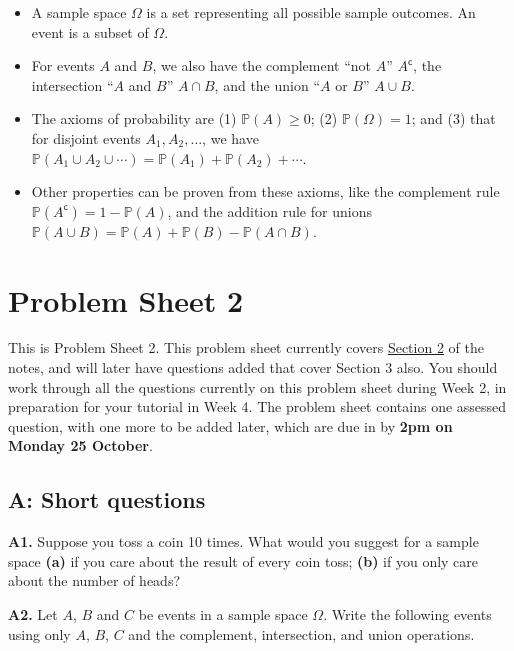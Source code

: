 \documentclass[
  a4paper,
]{book}
\providecommand{\tightlist}{%
  \setlength{\itemsep}{0pt}\setlength{\parskip}{0pt}}
\newif\ifcomm\commtrue
\theoremstyle{definition}
\theoremstyle{definition}
\theoremstyle{definition}
\theoremstyle{definition}
\theoremstyle{remark}
\begin{document}
\begin{itemize}
\tightlist
\item
  A sample space \(\Omega\) is a set representing all possible sample outcomes. An event is a subset of \(\Omega\).
\item
  For events \(A\) and \(B\), we also have the complement ``not \(A\)'' \(A^\mathsf{c}\), the intersection ``\(A\) and \(B\)'' \(A \cap B\), and the union ``\(A\) or \(B\)'' \(A \cup B\).
\item
  The axioms of probability are (1) \(\mathbb P(A) \geq 0\); (2) \(\mathbb P(\Omega) = 1\); and (3) that for disjoint events \(A_1, A_2, \dots\), we have \(\mathbb P(A_1 \cup A_2 \cup \cdots) = \mathbb P(A_1) + \mathbb P(A_2) + \cdots\).
\item
  Other properties can be proven from these axioms, like the complement rule \(\mathbb P(A^\mathsf{c}) = 1 - \mathbb P(A)\), and the addition rule for unions \(\mathbb P(A \cup B) = \mathbb P(A) + \mathbb P(B) - \mathbb P(A \cap B)\).
\end{itemize}

\hypertarget{P2}{%
\chapter*{Problem Sheet 2}\label{P2}}

\commfalse

This is Problem Sheet 2. This problem sheet currently covers \protect\hyperlink{S01-eda}{Section 2} of the notes, and will later have questions added that cover Section 3 also. You should work through all the questions currently on this problem sheet during Week 2, in preparation for your tutorial in Week 4. The problem sheet contains one assessed question, with one more to be added later, which are due in by \textbf{2pm on Monday 25 October}.

\hypertarget{P2-short}{%
\section*{A: Short questions}\label{P2-short}}

\textbf{A1.} Suppose you toss a coin 10 times. What would you suggest for a sample space \textbf{(a)} if you care about the result of every coin toss; \textbf{(b)} if you only care about the number of heads?

\textbf{A2.} Let \(A\), \(B\) and \(C\) be events in a sample space \(\Omega\). Write the following events using only \(A\), \(B\), \(C\) and the complement, intersection, and union operations.
\end{document}
